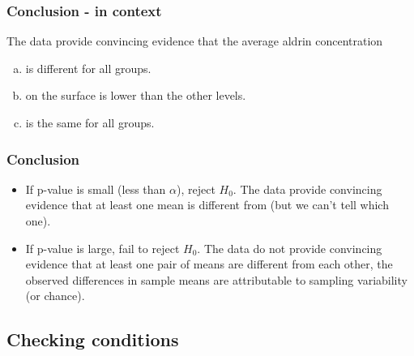 \documentclass[slidestop,compress,mathserif]{beamer}
\begin{document}
\begin{frame}
\frametitle{Conclusion - in context}


$\:$ \\

The data provide convincing evidence that the average aldrin concentration
\begin{enumerate}[(a)]

\item  is different for all groups.

\item on the surface is lower than the other levels.


\item is the same for all groups.

\end{enumerate}

\end{frame}


\begin{frame}
\frametitle{Conclusion}

\begin{itemize}

\item  If p-value is small (less than $\alpha$), reject $H_0$. The data provide convincing evidence that at least one mean is different from (but we can't tell which one).

\pause

\item If p-value is large, fail to reject $H_0$. The data do not provide convincing evidence that at least one pair of means are different from each other, the observed differences in sample means are attributable to sampling variability (or chance).

\end{itemize}

\end{frame}


\subsection{Checking conditions}

\end{document}
